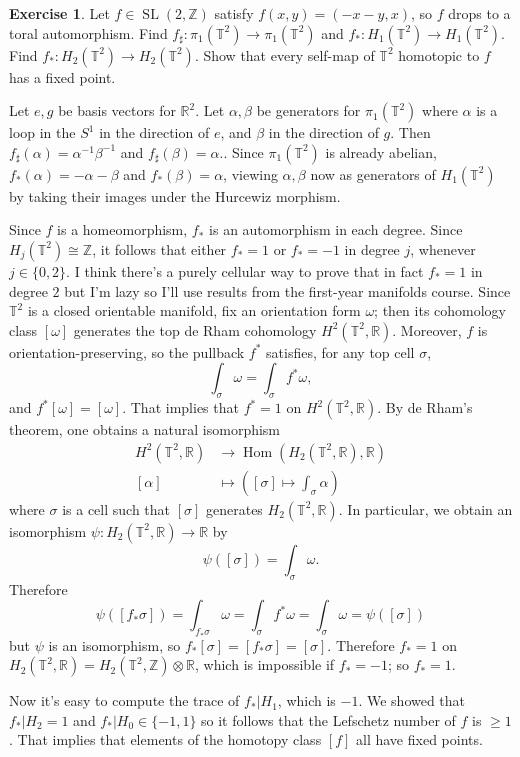 \documentclass[10pt]{article}
\newcommand{\ZZ}{\mathbb{Z}}
\newcommand{\RR}{\mathbb{R}}
\newcommand{\Hom}{\operatorname{Hom}}
\newcommand{\SL}{\operatorname{SL}}
\newcommand{\TT}{\mathbb T}
\theoremstyle{definition}
\newtheorem{exer}{Exercise}
\begin{document}
\begin{exer}
Let $f \in \SL(2, \ZZ)$ satisfy $f(x, y) = (-x-y, x)$, so $f$ drops to a toral automorphism.
Find $f_\sharp: \pi_1(\TT^2) \to \pi_1(\TT^2)$ and $f_*: H_1(\TT^2) \to H_1(\TT^2)$.
Find $f_*: H_2(\TT^2) \to H_2(\TT^2)$.
Show that every self-map of $\TT^2$ homotopic to $f$ has a fixed point.
\end{exer}

Let $e,g$ be basis vectors for $\RR^2$.
Let $\alpha, \beta$ be generators for $\pi_1(\TT^2)$ where $\alpha$ is a loop in the $S^1$ in the direction of $e$, and $\beta$ in the direction of $g$.
Then $f_\sharp(\alpha) = \alpha^{-1}\beta^{-1}$ and $f_\sharp(\beta) = \alpha$..
Since $\pi_1(\TT^2)$ is already abelian, $f_*(\alpha) = -\alpha - \beta$ and $f_*(\beta) = \alpha$, viewing $\alpha,\beta$ now as generators of $H_1(\TT^2)$ by taking their images under the Hurcewiz morphism.

Since $f$ is a homeomorphism, $f_*$ is an automorphism in each degree.
Since $H_j(\TT^2) \cong \ZZ$, it follows that either $f_* = 1$ or $f_* = -1$ in degree $j$, whenever $j \in \{0, 2\}$.
I think there's a purely cellular way to prove that in fact $f_* = 1$ in degree $2$ but I'm lazy so I'll use results from the first-year manifolds course.
Since $\TT^2$ is a closed orientable manifold, fix an orientation form $\omega$; then its cohomology class $[\omega]$ generates the top de Rham cohomology $H^2(\TT^2, \RR)$.
Moreover, $f$ is orientation-preserving, so the pullback $f^*$ satisfies, for any top cell $\sigma$,
$$\int_\sigma \omega = \int_\sigma f^*\omega,$$
and $f^*[\omega] = [\omega]$.
That implies that $f^* = 1$ on $H^2(\TT^2, \RR)$. By de Rham's theorem, one obtains a natural isomorphism
\begin{align*}
H^2(\TT^2, \RR) &\to \Hom(H_2(\TT^2, \RR), \RR)\\
[\alpha] &\mapsto \left([\sigma] \mapsto \int_\sigma \alpha \right)
\end{align*}
where $\sigma$ is a cell such that $[\sigma]$ generates $H_2(\TT^2, \RR)$.
In particular, we obtain an isomorphism $\psi: H_2(\TT^2, \RR) \to \RR$ by
$$\psi([\sigma]) = \int_\sigma \omega.$$
Therefore
$$\psi([f_*\sigma]) = \int_{f_*\sigma} \omega = \int_\sigma f^* \omega = \int_\sigma \omega = \psi([\sigma])$$
but $\psi$ is an isomorphism, so $f_*[\sigma] = [f_*\sigma] = [\sigma]$.
Therefore $f_* = 1$ on $H_2(\TT^2, \RR) = H_2(\TT^2, \ZZ) \otimes \RR$, which is impossible if $f_* = -1$; so $f_* = 1$.

Now it's easy to compute the trace of $f_*|H_1$, which is $-1$. We showed that $f_*|H_2 = 1$ and $f_*|H_0 \in \{-1, 1\}$ so it follows that the Lefschetz number of $f$ is $\geq 1$.
That implies that elements of the homotopy class $[f]$ all have fixed points.
\end{document}
